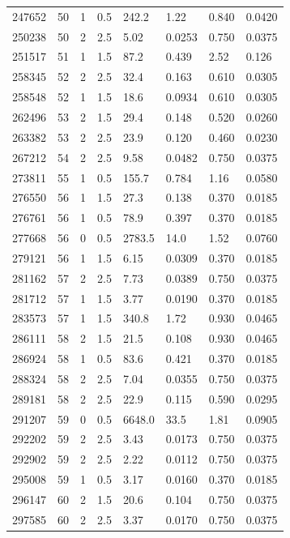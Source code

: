 \documentclass[preview]{standalone}
\begin{document}
{{{{\begin{tabular}{L{1.2cm}C{1.2cm} C{0.3cm}C{0.5cm} C{1.4cm}C{1.4cm} C{1.4cm}C{1.4cm}}
  247652  &    50  & 1     & 0.5 &  242.2  & 1.22  & 0.840 &  0.0420   \\ 
  250238  &    50  & 2     & 2.5 &  5.02  & 0.0253  & 0.750 &  0.0375   \\ 
  251517  &    51  & 1     & 1.5 &  87.2  & 0.439  & 2.52 &  0.126   \\ 
  258345  &    52  & 2     & 2.5 &  32.4  & 0.163  & 0.610 &  0.0305   \\ 
  258548  &    52  & 1     & 1.5 &  18.6  & 0.0934  & 0.610 &  0.0305   \\ 
  262496  &    53  & 2     & 1.5 &  29.4  & 0.148  & 0.520 &  0.0260   \\ 
  263382  &    53  & 2     & 2.5 &  23.9  & 0.120  & 0.460 &  0.0230   \\ 
  267212  &    54  & 2     & 2.5 &  9.58  & 0.0482  & 0.750 &  0.0375   \\ 
  273811  &    55  & 1     & 0.5 &  155.7  & 0.784  & 1.16 &  0.0580   \\ 
  276550  &    56  & 1     & 1.5 &  27.3  & 0.138  & 0.370 &  0.0185   \\ 
  276761  &    56  & 1     & 0.5 &  78.9  & 0.397  & 0.370 &  0.0185   \\ 
  277668  &    56  & 0     & 0.5 &  2783.5  & 14.0  & 1.52 &  0.0760   \\ 
  279121  &    56  & 1     & 1.5 &  6.15  & 0.0309  & 0.370 &  0.0185   \\ 
  281162  &    57  & 2     & 2.5 &  7.73  & 0.0389  & 0.750 &  0.0375   \\ 
  281712  &    57  & 1     & 1.5 &  3.77  & 0.0190  & 0.370 &  0.0185   \\ 
  283573  &    57  & 1     & 1.5 &  340.8  & 1.72  & 0.930 &  0.0465   \\ 
  286111  &    58  & 2     & 1.5 &  21.5  & 0.108  & 0.930 &  0.0465   \\ 
  286924  &    58  & 1     & 0.5 &  83.6  & 0.421  & 0.370 &  0.0185   \\ 
  288324  &    58  & 2     & 2.5 &  7.04  & 0.0355  & 0.750 &  0.0375   \\ 
  289181  &    58  & 2     & 2.5 &  22.9  & 0.115  & 0.590 &  0.0295   \\ 
  291207  &    59  & 0     & 0.5 &  6648.0  & 33.5  & 1.81 &  0.0905   \\ 
  292202  &    59  & 2     & 2.5 &  3.43  & 0.0173  & 0.750 &  0.0375   \\ 
  292902  &    59  & 2     & 2.5 &  2.22  & 0.0112  & 0.750 &  0.0375   \\ 
  295008  &    59  & 1     & 0.5 &  3.17  & 0.0160  & 0.370 &  0.0185   \\ 
  296147  &    60  & 2     & 1.5 &  20.6  & 0.104  & 0.750 &  0.0375   \\ 
  297585  &    60  & 2     & 2.5 &  3.37  & 0.0170  & 0.750 &  0.0375   \\ 
\hline 
\end{tabular} 

}}}}
\end{document}
